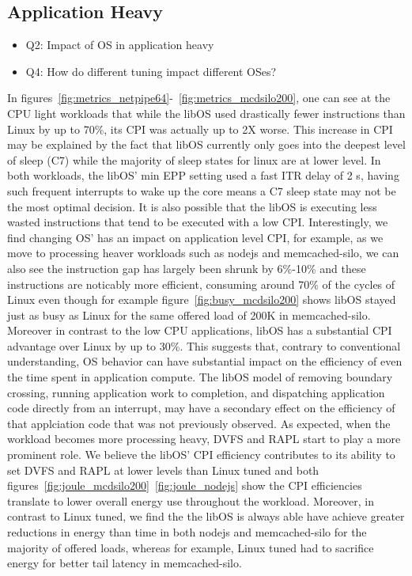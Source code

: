 \subsection{Application Heavy}
\label{sec:q4}
\begin{itemize}
\item Q2: Impact of OS in application heavy
\item Q4: How do different tuning impact different OSes?
\end{itemize}

In figures~\ref{fig:metrics_netpipe64}-~\ref{fig:metrics_mcdsilo200}, one can see at the CPU light workloads that while the libOS used drastically fewer instructions than Linux by up to 70\%, its CPI was actually up to 2X worse. This increase in CPI may be explained by the fact that libOS currently only goes into the deepest level of sleep (C7) while the majority of sleep states for linux are at lower level. In both workloads, the libOS' min EPP setting used a fast ITR delay of 2 \micro s, having such frequent interrupts to wake up the core means a C7 sleep state may not be the most optimal decision. It is also possible that the libOS is executing less wasted instructions that tend to be executed with a low CPI. Interestingly, we find changing OS' has an impact on application level CPI, for example, as we move to processing heaver workloads such as nodejs and memcached-silo, we can also see the instruction gap has largely been shrunk by 6\%-10\% and these instructions are noticably more efficient, consuming around 70\% of the cycles of Linux even though for example figure~\ref{fig:busy_mcdsilo200} shows libOS stayed just as busy as Linux for the same offered load of 200K in memcached-silo. Moreover in contrast to the low CPU applications, libOS has a substantial CPI advantage over Linux by up to 30\%. This suggests that, contrary to conventional understanding, OS behavior can have substantial impact on the efficiency of even the time spent in application compute. The libOS model of removing boundary crossing, running application work to completion, and dispatching application code directly from an interrupt, may have a secondary effect on the efficiency of that applciation code that was not previously observed. As expected, when the workload becomes more processing heavy, DVFS and RAPL start to play a more prominent role. We believe the libOS' CPI efficiency contributes to its ability to set DVFS and RAPL at lower levels than Linux tuned and both figures~\ref{fig:joule_mcdsilo200}~\ref{fig:joule_nodejs} show the CPI efficiencies translate to lower overall energy use throughout the workload. Moreover, in contrast to Linux tuned, we find the the libOS is always able have achieve greater reductions in energy than time in both nodejs and memcached-silo for the majority of offered loads, whereas for example, Linux tuned had to sacrifice energy for better tail latency in memcached-silo.
